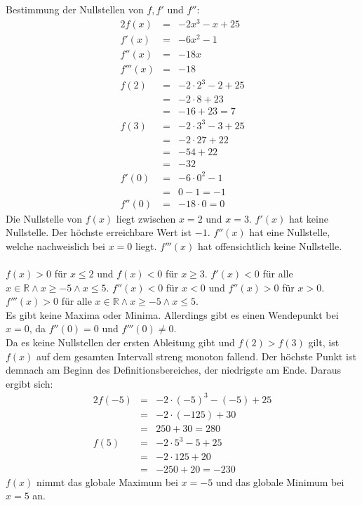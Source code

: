 \documentclass[10pt,a4paper,oneside,ngerman,numbers=noenddot]{scrartcl}
\begin{document}
\subsubsection{} %
Bestimmung der Nullstellen von $f, f'$ und $f''$:\\
\begin{alignat*}{2}
f(x) &=& -2x^{3} - x + 25 \\
f'(x) &=& -6x^{2} - 1 \\
f''(x) &=& -18x \\
f'''(x) &=& -18 \\
f(2) &=& -2 \cdot 2^{3} - 2 + 25 \\
&=& -2 \cdot 8 +23 \\
&=& -16 + 23 = 7 \\
f(3) &=& -2 \cdot 3^{3} - 3 + 25 \\
&=& -2 \cdot 27 + 22 \\
&=& -54 + 22 \\
&=& -32 \\
f'(0) &=& -6 \cdot 0^{2} - 1 \\
&=& 0 -1 = -1 \\
f''(0) &=& -18 \cdot 0 = 0
\end{alignat*}
Die Nullstelle von $f(x)$ liegt zwischen $x=2$ und $x=3$. $f'(x)$ hat keine Nullstelle. Der höchste erreichbare Wert ist $-1$. 
$f''(x)$ hat eine Nullstelle, welche nachweislich bei $x=0$ liegt.
$f'''(x)$ hat offensichtlich keine Nullstelle.\\
\\
$f(x) > 0$ für $x \leq 2$ und $f(x) < 0$ für $x \geq 3$. $f'(x) < 0$ für alle $x \in \mathbb{R} \wedge x \geq -5 \wedge x \leq 5$. $f''(x) < 0$ für $x < 0$ und $f''(x) > 0$ für $x > 0$. $f'''(x) > 0$ für alle $x \in \mathbb{R} \wedge x \geq -5 \wedge x \leq 5$. \\
Es gibt keine Maxima oder Minima. Allerdings gibt es einen Wendepunkt bei $x=0$, da $f''(0) = 0$ und $f'''(0) \neq 0$. \\
Da es keine Nullstellen der ersten Ableitung gibt und $f(2) > f(3)$ gilt, ist $f(x)$ auf dem gesamten Intervall streng monoton fallend. Der höchste Punkt ist demnach am Beginn des Definitionsbereiches, der niedrigste am Ende.
Daraus ergibt sich:\\
\begin{alignat*}{2}
f(-5) &=& -2 \cdot (-5)^{3} - (-5) + 25 \\
&=& -2 \cdot (-125) + 30 \\
&=& 250 + 30 = 280 \\
f(5) &=& -2 \cdot 5^{3} - 5 + 25 \\
&=& -2 \cdot 125 + 20 \\
&=& -250 + 20 = -230
\end{alignat*}
$f(x)$ nimmt das globale Maximum bei $x=-5$ und das globale Minimum bei $x=5$ an.
\end{document}
